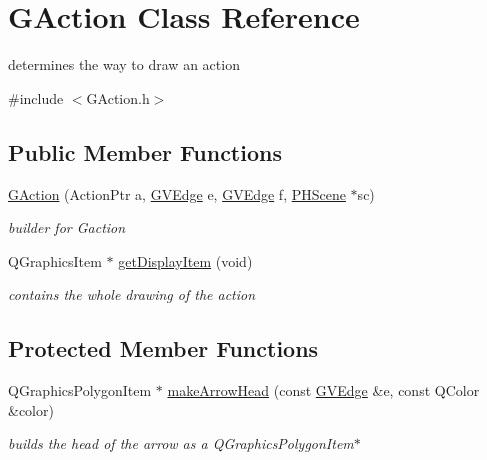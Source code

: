 \hypertarget{class_g_action}{\section{\-G\-Action \-Class \-Reference}
\label{class_g_action}
}


determines the way to draw an action  




{\ttfamily \#include $<$\-G\-Action.\-h$>$}

\subsection*{\-Public \-Member \-Functions}
\begin{DoxyCompactItemize}
\item 
\hypertarget{class_g_action_a697f4b533d191139a1eb401c486afff9}{\hyperlink{class_g_action_a697f4b533d191139a1eb401c486afff9}{\-G\-Action} (\-Action\-Ptr a, \hyperlink{struct_g_v_edge}{\-G\-V\-Edge} e, \hyperlink{struct_g_v_edge}{\-G\-V\-Edge} f, \hyperlink{class_p_h_scene}{\-P\-H\-Scene} $\ast$sc)}\label{class_g_action_a697f4b533d191139a1eb401c486afff9}

\begin{DoxyCompactList}\small\item\em builder for \-Gaction \end{DoxyCompactList}\item 
\-Q\-Graphics\-Item $\ast$ \hyperlink{class_g_action_ad3086cca158b494f7c2fd31783fb9f77}{get\-Display\-Item} (void)
\begin{DoxyCompactList}\small\item\em contains the whole drawing of the action \end{DoxyCompactList}\end{DoxyCompactItemize}
\subsection*{\-Protected \-Member \-Functions}
\begin{DoxyCompactItemize}
\item 
\-Q\-Graphics\-Polygon\-Item $\ast$ \hyperlink{class_g_action_afeb408bf85d902191cef8a3cf613c7eb}{make\-Arrow\-Head} (const \hyperlink{struct_g_v_edge}{\-G\-V\-Edge} \&e, const \-Q\-Color \&color)
\begin{DoxyCompactList}\small\item\em builds the head of the arrow as a \-Q\-Graphics\-Polygon\-Item$\ast$ \end{DoxyCompactList}\end{DoxyCompactItemize}
